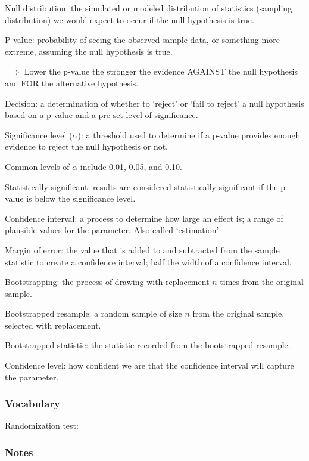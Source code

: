 \documentclass[
]{report}
\newcommand{\rgs}{\vspace{12pt}} %
\newcommand{\rgi}{\hspace{24pt}}  %
\begin{document}
Null distribution: the simulated or modeled distribution of statistics (sampling distribution) we would expect to occur if the null hypothesis is true.

P-value: probability of seeing the observed sample data, or something more extreme, assuming the null hypothesis is true.

\(\implies\) Lower the p-value the stronger the evidence AGAINST the null hypothesis and FOR the alternative hypothesis.

Decision: a determination of whether to `reject' or `fail to reject' a null hypothesis based on a p-value and a pre-set level of significance.

Significance level (\(\alpha\)): a threshold used to determine if a p-value provides enough evidence to reject the null hypothesis or not.

\rgi Common levels of \(\alpha\) include 0.01, 0.05, and 0.10.

Statistically significant: results are considered statistically significant if the p-value is below the significance level.

Confidence interval: a process to determine how large an effect is; a range of plausible values for the parameter. Also called `estimation'.

Margin of error: the value that is added to and subtracted from the sample statistic to create a confidence interval; half the width of a confidence interval.

Bootstrapping: the process of drawing with replacement \(n\) times from the original sample.

Bootstrapped resample: a random sample of size \(n\) from the original sample, selected with replacement.

Bootstrapped statistic: the statistic recorded from the bootstrapped resample.

Confidence level: how confident we are that the confidence interval will capture the parameter.

\hypertarget{vocabulary-15}{%
\subsubsection*{Vocabulary}\label{vocabulary-15}}

Randomization test:
\rgs

\hypertarget{notes-18}{%
\subsubsection*{Notes}\label{notes-18}}
\end{document}
